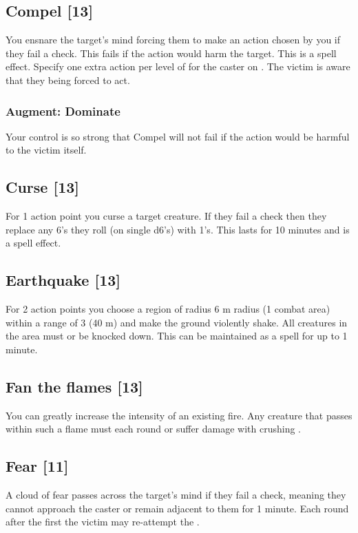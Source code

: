 \subsection{Compel [13]}
You ensnare the target's mind forcing them to make an action chosen by you if they fail a  check. This fails if the action would harm the target. This is a  spell effect. Specify one extra action per level of  for the caster on . The victim is aware that they being forced to act.
\subsubsection{Augment: Dominate}
Your control is so strong that Compel will not fail if the action would be harmful to the victim itself.

\subsection{Curse [13]}
For 1 action point you curse a target creature. If they fail a  check then they replace any 6's they roll (on single d6's) with 1's. This lasts for 10 minutes and  is a  spell effect.

\subsection{Earthquake [13]}
For 2 action points you choose a region of radius 6 m radius (1 combat area) within a range of 3 (40 m) and make the ground violently shake. All creatures in the area must  or be knocked down. This can be maintained as a  spell for up to 1 minute.

\subsection{Fan the flames [13]}
You can greatly increase the intensity of an existing fire. Any creature that passes within such a flame must  each round or suffer damage with crushing . 

\subsection{Fear [11]}
A cloud of fear passes across the target's mind if they fail a  check, meaning they cannot approach the caster or remain adjacent to them for 1 minute. Each round after the first the victim may re-attempt the . 
